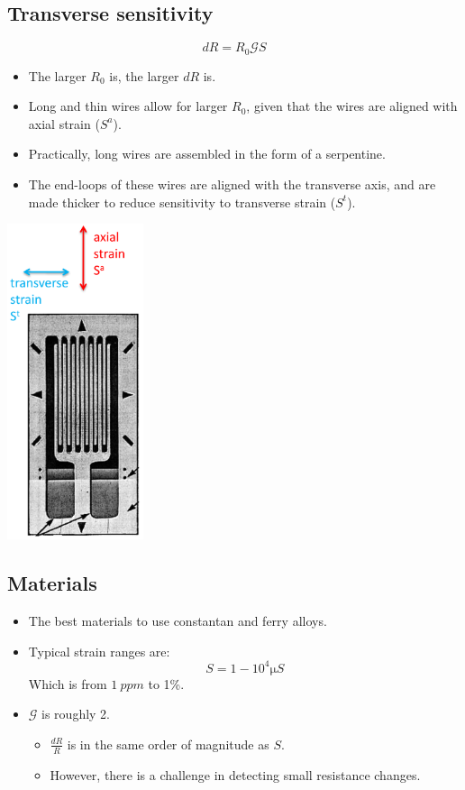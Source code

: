 \documentclass[11pt]{article}
\begin{document}
 \newpage
\subsection{Transverse sensitivity}
\label{sec:orge9b1dec}
\[dR = R_0 \mathcal{G} S\]
\begin{itemize}
\item The larger \(R_0\) is, the larger \(dR\) is.
\item Long and thin wires allow for larger \(R_0\), given that the wires are aligned with axial strain (\(S^a\)).
\item Practically, long wires are assembled in the form of a serpentine.
\item The end-loops of these wires are aligned with the transverse axis, and are made thicker to reduce sensitivity to transverse strain (\(S^t\)).
\end{itemize}

\begin{center}
\includegraphics[height=25em]{./images/transverse-versus-axial-strain-diagram.png}
\end{center}

 \newpage
\subsection{Materials}
\label{sec:org5f7b306}
\begin{itemize}
\item The best materials to use constantan and ferry alloys.
\item Typical strain ranges are:
\[S = 1 - 10^4 \unit{\micro S}\]
Which is from \(\qty{1}{ppm}\) to 1\%.
\item \(\mathcal{G}\) is roughly 2.
\begin{itemize}
\item \(\frac{dR}{R}\) is in the same order of magnitude as \(S\).
\item However, there is a challenge in detecting small resistance changes.
\end{itemize}
\end{itemize}
\end{document}
